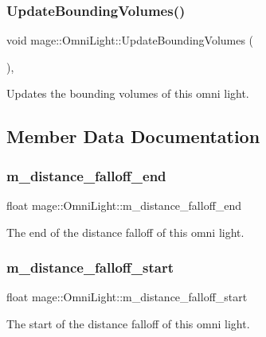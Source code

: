 \subsubsection{\texorpdfstring{Update\+Bounding\+Volumes()}{UpdateBoundingVolumes()}}
{\footnotesize\ttfamily void mage\+::\+Omni\+Light\+::\+Update\+Bounding\+Volumes (\begin{DoxyParamCaption}{ }\end{DoxyParamCaption})\hspace{0.3cm}{\ttfamily [private]}, {\ttfamily [noexcept]}}

Updates the bounding volumes of this omni light. 

\subsection{Member Data Documentation}
\hypertarget{classmage_1_1_omni_light_a4ee5cc4103305dc96b43d6286858ef74}{}\label{classmage_1_1_omni_light_a4ee5cc4103305dc96b43d6286858ef74} 
\subsubsection{\texorpdfstring{m\+\_\+distance\+\_\+falloff\+\_\+end}{m\_distance\_falloff\_end}}
{\footnotesize\ttfamily float mage\+::\+Omni\+Light\+::m\+\_\+distance\+\_\+falloff\+\_\+end\hspace{0.3cm}{\ttfamily [private]}}

The end of the distance falloff of this omni light. \hypertarget{classmage_1_1_omni_light_ab784744d39ad3d4f4a7b2214a55108f7}{}\label{classmage_1_1_omni_light_ab784744d39ad3d4f4a7b2214a55108f7} 
\subsubsection{\texorpdfstring{m\+\_\+distance\+\_\+falloff\+\_\+start}{m\_distance\_falloff\_start}}
{\footnotesize\ttfamily float mage\+::\+Omni\+Light\+::m\+\_\+distance\+\_\+falloff\+\_\+start\hspace{0.3cm}{\ttfamily [private]}}

The start of the distance falloff of this omni light. 